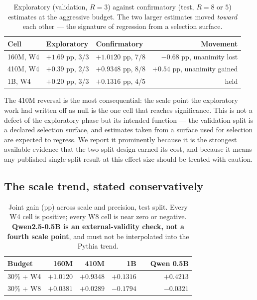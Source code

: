 \begin{table}[t]
\centering
\caption{Exploratory (validation, $R{=}3$) against confirmatory (test, $R{=}8$ or $5$)
estimates at the aggressive budget. The two larger estimates moved \emph{toward} each other
--- the signature of regression from a selection surface.}
\label{tab:replication}
\begin{tabular}{@{}lllr@{}}
\toprule
\textbf{Cell} & \textbf{Exploratory} & \textbf{Confirmatory} & \textbf{Movement} \\
\midrule
160M, W4 & $+1.69$ pp, 3/3 & $+1.0120$ pp, 7/8 & $-0.68$ pp, unanimity lost \\
410M, W4 & $+0.39$ pp, 2/3 & $+0.9348$ pp, 8/8 & $+0.54$ pp, unanimity gained \\
1B, W4   & $+0.20$ pp, 3/3 & $+0.1316$ pp, 4/5 & held \\
\bottomrule
\end{tabular}
\end{table}

The 410M reversal is the most consequential: the scale point the exploratory work had written
off as null is the one cell that reaches significance. This is not a defect of the
exploratory phase but its intended function --- the validation split is a declared selection
surface, and estimates taken from a surface used for selection are expected to regress. We
report it prominently because it is the strongest available evidence that the two-split
design earned its cost, and because it means any published single-split result at this effect
size should be treated with caution.

\subsection{The scale trend, stated conservatively}
\label{subsec:trend}

\begin{table}[t]
\centering
\caption{Joint gain (pp) across scale and precision, test split. Every W4 cell is positive;
every W8 cell is near zero or negative. \textbf{Qwen2.5-0.5B is an external-validity check,
not a fourth scale point}, and must not be interpolated into the Pythia trend.}
\label{tab:trend}
\begin{tabular}{@{}lrrrcr@{}}
\toprule
\textbf{Budget} & \textbf{160M} & \textbf{410M} & \textbf{1B} & & \textbf{Qwen 0.5B} \\
\midrule
30\% + W4 & $+1.0120$ & $+0.9348$ & $+0.1316$ & & $+0.4213$ \\
30\% + W8 & $+0.0381$ & $+0.0289$ & $-0.1794$ & & $-0.0321$ \\
\bottomrule
\end{tabular}
\end{table}

